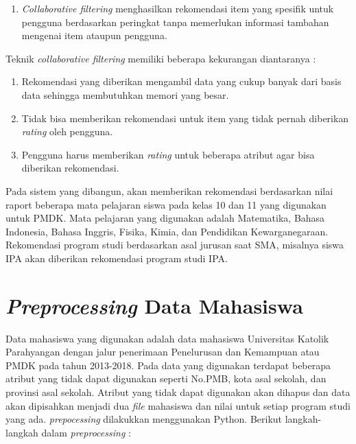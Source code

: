 \begin{enumerate}
    \item \textit{Collaborative filtering} menghasilkan rekomendasi item yang spesifik untuk pengguna berdasarkan peringkat tanpa memerlukan informasi tambahan mengenai item ataupun pengguna.
    
\end{enumerate}

Teknik \textit{collaborative filtering} memiliki beberapa kekurangan diantaranya : 

\begin{enumerate}
    \item Rekomendasi yang diberikan mengambil data yang cukup banyak dari basis data sehingga membutuhkan memori yang besar.
    
    \item Tidak bisa memberikan rekomendasi untuk item yang tidak pernah diberikan \textit{rating} oleh pengguna.
    
    \item Pengguna harus memberikan \textit{rating} untuk beberapa atribut agar bisa diberikan rekomendasi.
    
\end{enumerate}

Pada sistem yang dibangun, akan memberikan rekomendasi berdasarkan nilai raport beberapa mata pelajaran siswa pada kelas 10 dan 11 yang digunakan untuk PMDK. Mata pelajaran yang digunakan adalah Matematika, Bahasa Indonesia, Bahasa Inggris, Fisika, Kimia, dan Pendidikan Kewarganegaraan. Rekomendasi program studi berdasarkan asal jurusan saat SMA, misalnya siswa IPA akan diberikan rekomendasi program studi IPA.

\section{\textit{Preprocessing} Data Mahasiswa}
\label{sec:preprocessing}
Data mahasiswa yang digunakan adalah data mahasiswa Universitas Katolik Parahyangan dengan jalur penerimaan Penelurusan dan Kemampuan atau PMDK pada tahun 2013-2018. Pada data yang digunakan terdapat beberapa atribut yang tidak dapat digunakan seperti No.PMB,  kota asal sekolah, dan provinsi asal sekolah. Atribut yang tidak dapat digunakan akan dihapus dan data akan dipisahkan menjadi dua \textit{file} mahasiswa dan nilai untuk setiap program studi yang ada. \textit{prepocessing} dilakukkan menggunakan Python. Berikut langkah-langkah dalam \textit{preprocessing} :

